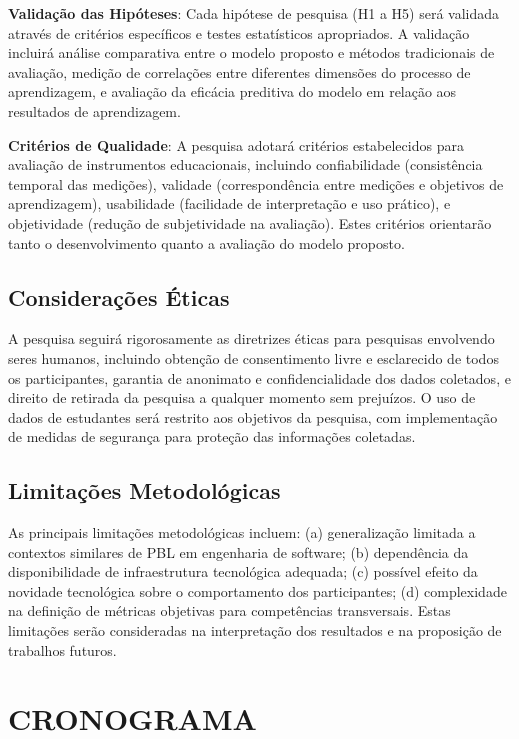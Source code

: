 \documentclass[12pt,a4paper]{article}
\begin{document}
\textbf{Validação das Hipóteses}: Cada hipótese de pesquisa (H1 a H5) será validada através de critérios específicos e testes estatísticos apropriados. A validação incluirá análise comparativa entre o modelo proposto e métodos tradicionais de avaliação, medição de correlações entre diferentes dimensões do processo de aprendizagem, e avaliação da eficácia preditiva do modelo em relação aos resultados de aprendizagem.

\textbf{Critérios de Qualidade}: A pesquisa adotará critérios estabelecidos para avaliação de instrumentos educacionais, incluindo confiabilidade (consistência temporal das medições), validade (correspondência entre medições e objetivos de aprendizagem), usabilidade (facilidade de interpretação e uso prático), e objetividade (redução de subjetividade na avaliação). Estes critérios orientarão tanto o desenvolvimento quanto a avaliação do modelo proposto.

\subsection{Considerações Éticas}

A pesquisa seguirá rigorosamente as diretrizes éticas para pesquisas envolvendo seres humanos, incluindo obtenção de consentimento livre e esclarecido de todos os participantes, garantia de anonimato e confidencialidade dos dados coletados, e direito de retirada da pesquisa a qualquer momento sem prejuízos. O uso de dados de estudantes será restrito aos objetivos da pesquisa, com implementação de medidas de segurança para proteção das informações coletadas.

\subsection{Limitações Metodológicas}

As principais limitações metodológicas incluem: (a) generalização limitada a contextos similares de PBL em engenharia de software; (b) dependência da disponibilidade de infraestrutura tecnológica adequada; (c) possível efeito da novidade tecnológica sobre o comportamento dos participantes; (d) complexidade na definição de métricas objetivas para competências transversais. Estas limitações serão consideradas na interpretação dos resultados e na proposição de trabalhos futuros.

\section{CRONOGRAMA}
\end{document}
